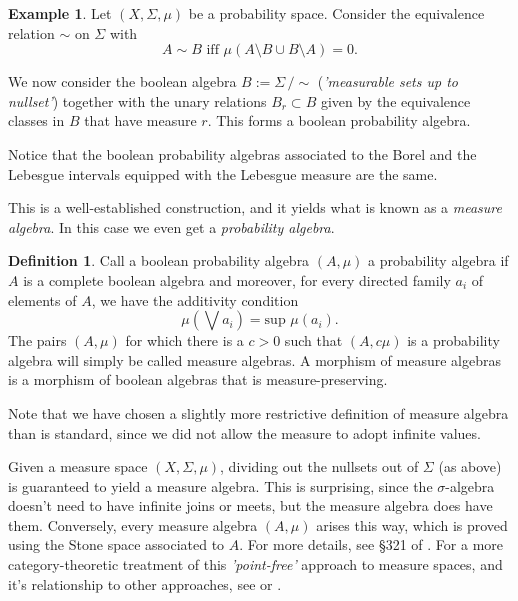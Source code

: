 \documentclass[a4paper]{amsproc}
\theoremstyle{plain}
\theoremstyle{definition}
\newtheorem{example}[theorem]{Example}
\newtheorem{definition}[theorem]{Definition}
\theoremstyle{remark}
\numberwithin{equation}{section}
\newcommand{\s}{\textsf{ }}
\begin{document}
\begin{example}\label{mod_nullset}
    Let $(X, \Sigma, \mu)$ be a probability space. Consider the equivalence relation $\sim$ on $\Sigma$ with
    \begin{equation*}
        A \sim B \text{ iff } \mu (A \setminus B \cup B \setminus A) = 0 .
    \end{equation*}

    We now consider the boolean algebra $B := \Sigma \, / \sim$\s (\emph{'measurable sets up to nullset'}) together with the unary relations $B_r \subset B$ given by the equivalence classes in $B$ that have measure $r$. This forms a boolean probability algebra.

    Notice that the boolean probability algebras associated to the Borel and the Lebesgue intervals equipped with the Lebesgue measure are the same.
\end{example}

This is a well-established construction, and it yields what is known as a \emph{measure algebra}. In this case we even get a \emph{probability algebra}.

\begin{definition}\label{probability_alg}
    Call a boolean probability algebra $(A,\mu)$ a probability algebra if $A$ is a complete boolean algebra and moreover, for every directed family $a_i$ of elements of $A$, we have the additivity condition
    \[
    \mu(\bigvee a_i) = \text{sup } \mu(a_i) .
    \]
    The pairs $(A,\mu)$ for which there is a $c > 0$ such that $(A, c \mu)$ is a probability algebra will simply be called measure algebras. A morphism of measure algebras is a morphism of boolean algebras that is measure-preserving.
\end{definition}

Note that we have chosen a slightly more restrictive definition of measure algebra than is standard, since we did not allow the measure to adopt infinite values.

Given a measure space $(X,\Sigma,\mu)$, dividing out the nullsets out of $\Sigma$ (as above) is guaranteed to yield a measure algebra. This is surprising, since the $\sigma$-algebra doesn't need to have infinite joins or meets, but the measure algebra does have them. Conversely, every measure algebra $(A,\mu)$ arises this way, which is proved using the Stone space associated to $A$. For more details, see \S 321 of \cite{fremlin2012measure}. For a more category-theoretic treatment of this \emph{'point-free'} approach to measure spaces, and it's relationship to other approaches, see \cite{pavlov2022gelfand} or \cite{jamneshan2020foundational}.
\end{document}
